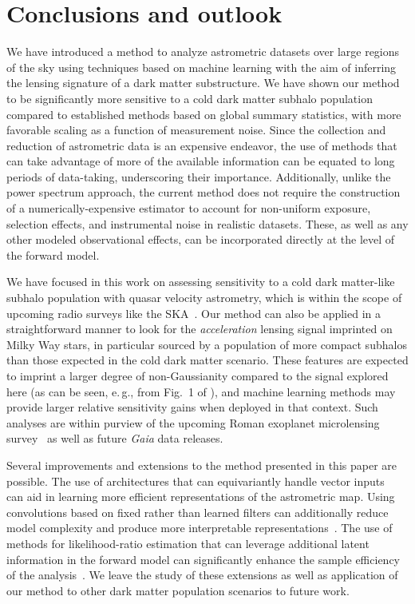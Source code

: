 \documentclass[twocolumn,linenumbers]{aastex631}
\newcommand{\eg}{{e.\,g.}\xspace}
\begin{document}
\section{Conclusions and outlook}
\label{sec:conclusions}

We have introduced a method to analyze astrometric datasets over large regions of the sky using techniques based on machine learning with the aim of inferring the lensing signature of a dark matter substructure. We have shown our method to be significantly more sensitive to a cold dark matter subhalo population compared to established methods based on global summary statistics, with more favorable scaling as a function of measurement noise. Since the collection and reduction of astrometric data is an expensive endeavor, the use of methods that can take advantage of more of the available information can be equated to long periods of data-taking, underscoring their importance. Additionally, unlike the power spectrum approach, the current method does not require the construction of a numerically-expensive estimator to account for non-uniform exposure, selection effects, and instrumental noise in realistic datasets. These, as well as any other modeled observational effects, can be incorporated directly at the level of the forward model. 

We have focused in this work on assessing sensitivity to a cold dark matter-like subhalo population with quasar velocity astrometry, which is within the scope of upcoming radio surveys like the SKA~\citep{Fomalont:2004hr,Jarvis:2015tqa}. Our method can also be applied in a straightforward manner to look for the \emph{acceleration} lensing signal imprinted on Milky Way stars, in particular sourced by a population of more compact subhalos than those expected in the cold dark matter scenario. These features are expected to imprint a larger degree of non-Gaussianity compared to the signal explored here (as can be seen, \eg, from Fig.~1 of \citet{Mishra-Sharma:2020ynk}), and machine learning methods may provide larger relative sensitivity gains when deployed in that context. Such analyses are within purview of the upcoming Roman exoplanet microlensing survey~\citep{Pardo:2021uzy} as well as future \emph{Gaia} data releases.

Several improvements and extensions to the method presented in this paper are possible. The use of architectures that can equivariantly handle vector inputs~\citep{esteves2020spinweighted} can aid in learning more efficient representations of the astrometric map. Using convolutions based on fixed rather than learned filters can additionally reduce model complexity and produce more interpretable representations~\citep{Cheng:2020qbx,2021arXiv210709145H,2021arXiv210411244S,2021arXiv210202828M,Valogiannis:2021chp}. The use of methods for likelihood-ratio estimation that can leverage additional latent information in the forward model can significantly enhance the sample efficiency of the analysis~\citep{Brehmer:2018eca,Brehmer:2018hga,Brehmer:2018kdj,Stoye:2018ovl}. We leave the study of these extensions as well as application of our method to other dark matter population scenarios to future work.
\end{document}
